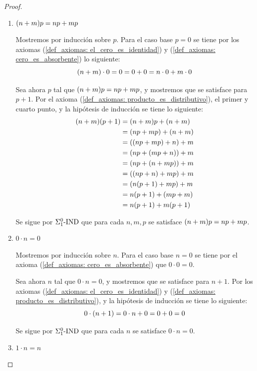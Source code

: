 \begin{proof}
\begin{enumerate}
		Se sigue por $\INDUCCION{\Sigma_{1}^{0}}$ que para cada $n, m, p$ se satisface $\pa*{nm}p = n\pa*{mp}$.

		\item $\pa*{n + m}p = np + mp$
		
		Mostremos por inducción sobre $p$. Para el caso base $p = 0$ se tiene por los axiomas (\ref{def_axiomas: el_cero_es_identidad}) y (\ref{def_axiomas: cero_es_absorbente}) lo siguiente:
		\[
			\pa*{n + m}\cdot 0 = 0 = 0 + 0 = n\cdot 0 + m\cdot 0
		\]

		Sea ahora $p$ tal que $\pa*{n + m}p = np + mp$, y mostremos que se satisface para $p + 1$. Por el axioma (\ref{def_axiomas: producto_es_distributivo}), el primer y cuarto punto, y la hipótesis de inducción se tiene lo siguiente:
		\begin{align*}
			\pa*{n + m}\pa*{p + 1} &= \pa*{n + m}p + \pa*{n + m} \\
			&=\pa*{np + mp} +\pa*{n + m}\\
			&=\pa*{\pa*{np + mp} + n} + m\\
			&=\pa*{np +\pa*{mp + n}} + m\\
			&=\pa*{np +\pa*{n + mp}} + m\\
			&=\pa*{\pa*{np + n} + mp} + m\\
			&=\pa*{n\pa*{p + 1} + mp} + m\\
			&= n\pa*{p + 1} +\pa*{mp + m}\\
			&=n\pa*{p + 1} + m\pa*{p + 1}
		\end{align*}

		Se sigue por $\INDUCCION{\Sigma_{1}^{0}}$ que para cada $n, m, p$ se satisface $\pa*{n + m}p = np + mp$.

		\item $0\cdot n = 0$
		
		Mostremos por inducción sobre $n$. Para el caso base $n = 0$ se tiene por el axioma (\ref{def_axiomas: cero_es_absorbente}) que $0\cdot 0 = 0$.

		Sea ahora $n$ tal que $0\cdot n = 0$, y mostremos que se satisface para $n + 1$. Por los axiomas (\ref{def_axiomas: el_cero_es_identidad}) y (\ref{def_axiomas: producto_es_distributivo}), y la hipótesis de inducción se tiene lo siguiente:
		\[
			0\cdot\pa*{n + 1} = 0\cdot n + 0 = 0 + 0 = 0
		\]

		Se sigue por $\INDUCCION{\Sigma_{1}^{0}}$ que para cada $n$ se satisface $0\cdot n = 0$.

		\item $1\cdot n = n$
		

\end{enumerate}
\end{proof}
